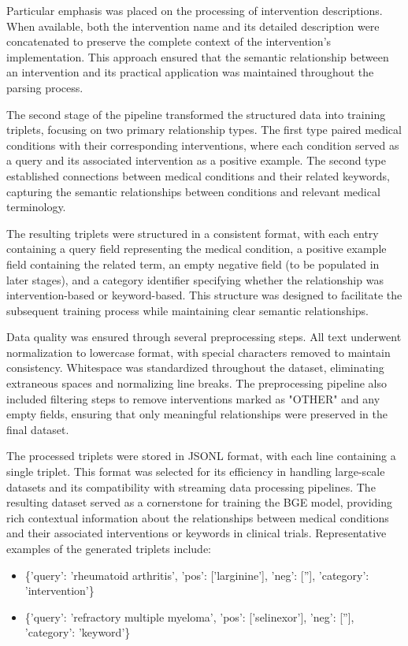 Particular emphasis was placed on the processing of intervention descriptions. When available, both the intervention name and its detailed description were concatenated to preserve the complete context of the intervention's implementation. This approach ensured that the semantic relationship between an intervention and its practical application was maintained throughout the parsing process.

The second stage of the pipeline transformed the structured data into training triplets, focusing on two primary relationship types. The first type paired medical conditions with their corresponding interventions, where each condition served as a query and its associated intervention as a positive example. The second type established connections between medical conditions and their related keywords, capturing the semantic relationships between conditions and relevant medical terminology.

The resulting triplets were structured in a consistent format, with each entry containing a query field representing the medical condition, a positive example field containing the related term, an empty negative field (to be populated in later stages), and a category identifier specifying whether the relationship was intervention-based or keyword-based. This structure was designed to facilitate the subsequent training process while maintaining clear semantic relationships.

Data quality was ensured through several preprocessing steps. All text underwent normalization to lowercase format, with special characters removed to maintain consistency. Whitespace was standardized throughout the dataset, eliminating extraneous spaces and normalizing line breaks. The preprocessing pipeline also included filtering steps to remove interventions marked as "OTHER" and any empty fields, ensuring that only meaningful relationships were preserved in the final dataset.

The processed triplets were stored in JSONL format, with each line containing a single triplet. This format was selected for its efficiency in handling large-scale datasets and its compatibility with streaming data processing pipelines. The resulting dataset served as a cornerstone for training the BGE model, providing rich contextual information about the relationships between medical conditions and their associated interventions or keywords in clinical trials. Representative examples of the generated triplets include:

\begin{itemize}
    \item \{'query': 'rheumatoid arthritis', 'pos': ['larginine'], 'neg': [''], 'category': 'intervention'\}
    \item \{'query': 'refractory multiple myeloma', 'pos': ['selinexor'], 'neg': [''], 'category': 'keyword'\}
\end{itemize}

